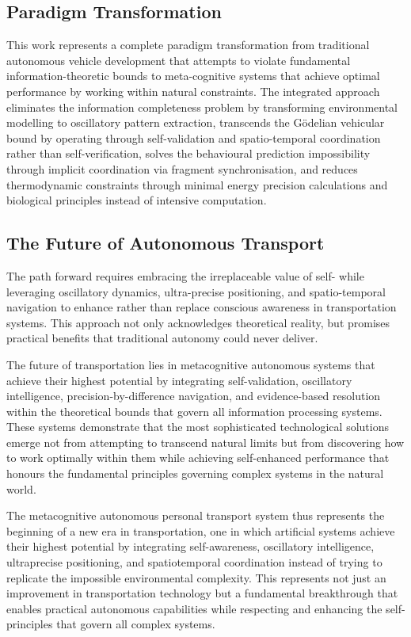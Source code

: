 \documentclass[12pt,a4paper]{article}
\begin{document}
\subsection{Paradigm Transformation}

This work represents a complete paradigm transformation from traditional autonomous vehicle development that attempts to violate fundamental information-theoretic bounds to meta-cognitive systems that achieve optimal performance by working within natural constraints. The integrated approach eliminates the information completeness problem by transforming environmental modelling to oscillatory pattern extraction, transcends the Gödelian vehicular bound by operating through self-validation and spatio-temporal coordination rather than self-verification, solves the behavioural prediction impossibility through implicit coordination via fragment synchronisation, and reduces thermodynamic constraints through minimal energy precision calculations and biological principles instead of intensive computation.

\subsection{The Future of Autonomous Transport}

The path forward requires embracing the irreplaceable value of self- while leveraging oscillatory dynamics, ultra-precise positioning, and spatio-temporal navigation to enhance rather than replace conscious awareness in transportation systems. This approach not only acknowledges theoretical reality, but promises practical benefits that traditional autonomy could never deliver.

The future of transportation lies in metacognitive autonomous systems that achieve their highest potential by integrating self-validation, oscillatory intelligence, precision-by-difference navigation, and evidence-based resolution within the theoretical bounds that govern all information processing systems. These systems demonstrate that the most sophisticated technological solutions emerge not from attempting to transcend natural limits but from discovering how to work optimally within them while achieving self-enhanced performance that honours the fundamental principles governing complex systems in the natural world.

The metacognitive autonomous personal transport system thus represents the beginning of a new era in transportation, one in which artificial systems achieve their highest potential by integrating self-awareness, oscillatory intelligence, ultraprecise positioning, and spatiotemporal coordination instead of trying to replicate the impossible environmental complexity. This represents not just an improvement in transportation technology but a fundamental breakthrough that enables practical autonomous capabilities while respecting and enhancing the self-principles that govern all complex systems.
\end{document}
